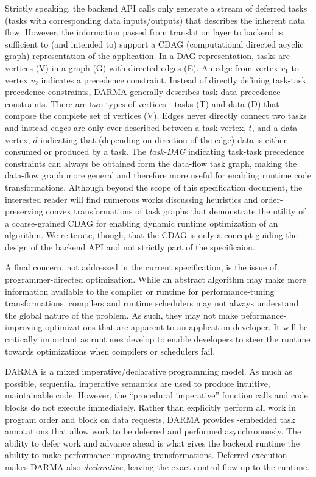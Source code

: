 Strictly speaking, the backend API calls only generate a stream of deferred tasks (tasks with corresponding data inputs/outputs) that describes the inherent data flow.
However, the information passed from translation layer to backend is sufficient to (and intended to) support a CDAG (computational directed acyclic graph) representation of the application.
In a DAG representation, tasks are vertices (V) in a graph (G) with directed edges (E).
An edge from vertex $v_1$ to vertex $v_2$ indicates a precedence constraint.
Instead of directly defining task-task precedence constraints, DARMA generally describes task-data precedence constraints.
There are two types of vertices - tasks (T) and data (D) that compose the complete set of vertices (V).
Edges never directly connect two tasks and instead edges are only ever described between a task vertex, $t$, and a data vertex, $d$
indicating that (depending on direction of the edge) data is either consumed or produced by a task.
The \emph{task-DAG} indicating task-task precedence constraints can always be obtained form the data-flow task graph,
making the data-flow graph more general and therefore more useful for enabling runtime code transformations.
Although beyond the scope of this specification document, the interested reader will find numerous works discussing heuristics and order-preserving convex transformations of task graphs that demonstrate the utility of a coarse-grained CDAG for enabling dynamic runtime optimization of an algorithm.
We reiterate, though, that the CDAG is only a concept guiding the design of the backend API and not strictly part of the specificaion.

A final concern, not addressed in the current specification, is the issue of programmer-directed optimization.
While an abstract algorithm may make more information available to the compiler or runtime for performance-tuning transformations,
compilers and runtime schedulers may not always understand the global nature of the problem.
As such,  they may not make peformance-improving optimizations that are apparent to an application developer.
It will be critically important as runtimes develop to enable developers to steer the runtime towards optimizations when compilers or schedulers fail.

DARMA is a mixed \gls{imperative}/\gls{declarative} \gls{programming model}.
As much as possible, sequential imperative semantics are used to produce intuitive, maintainable code.
However, the ``procedural imperative'' function calls and code blocks do not execute immediately.
Rather than explicitly perform all work in program order and block on data requests,
DARMA provides \CC-embedded task annotations that allow work to be deferred and performed asynchronously.
The ability to defer work and advance ahead is what gives the backend runtime the ability to make performance-improving transformations.
Deferred execution makes DARMA also \emph{declarative}, leaving the exact control-flow up to the runtime.

